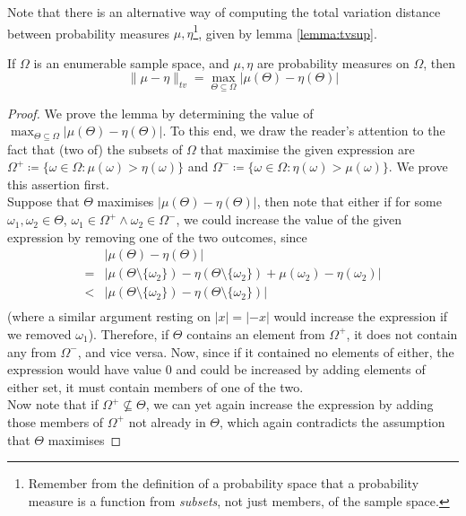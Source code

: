 	Note that there is an alternative way of computing the total variation distance between
	probability measures $\mu, \eta$\footnote{Remember from the definition of a probability space
	that a probability measure is a function from \emph{subsets}, not just members, of the sample
	space.}, given by lemma \ref{lemma:tvsup}.
	\begin{lemma}
		\label{lemma:tvsup}
		If $\Omega$ is an enumerable sample space, and $\mu, \eta$ are probability measures
		on $\Omega$, then 
		$$
			\|\mu - \eta\|_{tv} = \max_{\Theta \subseteq \Omega}|\mu(\Theta)-
			\eta(\Theta)|
		$$
	\end{lemma}
	\begin{proof}
		We prove the lemma by determining the value of $\max_{\Theta \subseteq \Omega}|\mu
		(\Theta) - \eta(\Theta)|$. To this end, we draw the reader's attention to the fact 
		that (two of) the subsets of $\Omega$ that maximise the given expression are $\Omega^+ 
		\coloneqq \{\omega \in \Omega : \mu(\omega) > \eta(\omega)\}$ and $\Omega^-\coloneqq
		\{\omega \in \Omega : \eta(\omega) > \mu(\omega)\}$. We prove this assertion first.
		\\
		Suppose that $\Theta$ maximises $|\mu(\Theta) - \eta(\Theta)|$, then note that either
		if for some $\omega_1, \omega_2 \in \Theta$, $\omega_1\in\Omega^+\land\omega_2\in
		\Omega^-$, we could increase the value of the given expression by removing one of the
		two outcomes, since 
		\begin{align*}
			&|\mu(\Theta) - \eta(\Theta)| \\
			=&|\mu(\Theta\setminus\{\omega_{2}\})-\eta(\Theta\setminus\{\omega_{2}\})
			+\mu(\omega_2)-\eta(\omega_2) | \\
			<&|\mu(\Theta\setminus\{\omega_2\})-\eta(\Theta\setminus\{\omega_2\})|\\
		\end{align*}
		(where a similar argument resting on $|x| = |-x|$ would increase the expression if 
		we removed $\omega_1$). Therefore, if $\Theta$ contains an element from $\Omega^+$,
		it does not contain any from $\Omega^-$, and vice versa. Now, since if it contained 
		no elements of either, the expression would have value $0$ and could be increased by 
		adding elements of either set, it must contain members of one of the two.
		\\
		Now note that if $\Omega^+ \not\subseteq \Theta$, 
		we can yet again increase the expression by adding those members of $\Omega^+$ not 
		already in $\Theta$, which again contradicts the assumption that $\Theta$ maximises

\end{proof}
